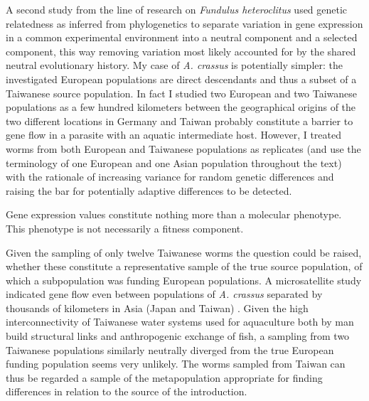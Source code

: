 \documentclass[10pt]{article}
\begin{document}
A second study from the line of research on \textit{Fundulus
  heteroclitus} \cite{pmid16567645} used genetic relatedness as
inferred from phylogenetics to separate variation in gene expression
in a common experimental environment into a neutral component and a
selected component, this way removing variation most likely accounted
for by the shared neutral evolutionary history. My case of
\textit{A. crassus} is potentially simpler: the investigated European
populations are direct descendants and thus a subset of a Taiwanese
source population. In fact I studied two European and two Taiwanese
populations as a few hundred kilometers between the geographical
origins of the two different locations in Germany and Taiwan probably
constitute a barrier to gene flow in a parasite with an aquatic
intermediate host. However, I treated worms from both European and
Taiwanese populations as replicates (and use the terminology of one
European and one Asian population throughout the text) with the
rationale of increasing variance for random genetic differences and
raising the bar for potentially adaptive differences to be detected.


Gene expression values constitute nothing more than a molecular
phenotype. This phenotype is not necessarily a fitness component.

Given the sampling of only twelve Taiwanese worms the question could
be raised, whether these constitute a representative sample of the
true source population, of which a subpopulation was funding European
populations. A microsatellite study indicated gene flow even between
populations of \textit{A. crassus} separated by thousands of
kilometers in Asia (Japan and Taiwan)
\cite{wielgoss_population_2008}. Given the high interconnectivity of
Taiwanese water systems used for aquaculture both by man build
structural links and anthropogenic exchange of fish, a sampling from
two Taiwanese populations similarly neutrally diverged from the true
European funding population seems very unlikely. The worms sampled
from Taiwan can thus be regarded a sample of the metapopulation
appropriate for finding differences in relation to the source of the
introduction.
\end{document}
